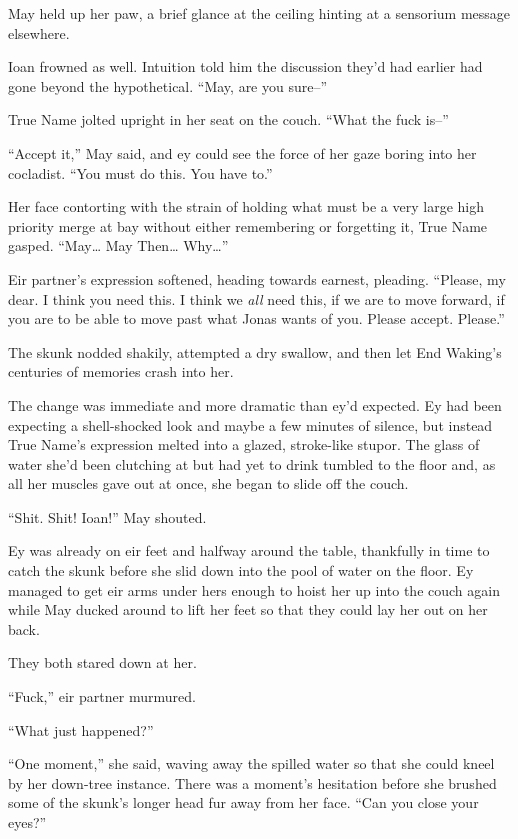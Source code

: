May held up her paw, a brief glance at the ceiling hinting at a sensorium message elsewhere.

Ioan frowned as well. Intuition told him the discussion they'd had earlier had gone beyond the hypothetical. ``May, are you sure--''

True Name jolted upright in her seat on the couch. ``What the fuck is--''

``Accept it,'' May said, and ey could see the force of her gaze boring into her cocladist. ``You must do this. You have to.''

Her face contorting with the strain of holding what must be a very large high priority merge at bay without either remembering or forgetting it, True Name gasped. ``May\ldots{} May Then\ldots{} Why\ldots{}''

Eir partner's expression softened, heading towards earnest, pleading. ``Please, my dear. I think you need this. I think we \emph{all} need this, if we are to move forward, if you are to be able to move past what Jonas wants of you. Please accept. Please.''

The skunk nodded shakily, attempted a dry swallow, and then let End Waking's centuries of memories crash into her.

The change was immediate and more dramatic than ey'd expected. Ey had been expecting a shell-shocked look and maybe a few minutes of silence, but instead True Name's expression melted into a glazed, stroke-like stupor. The glass of water she'd been clutching at but had yet to drink tumbled to the floor and, as all her muscles gave out at once, she began to slide off the couch.

``Shit. Shit! Ioan!'' May shouted.

Ey was already on eir feet and halfway around the table, thankfully in time to catch the skunk before she slid down into the pool of water on the floor. Ey managed to get eir arms under hers enough to hoist her up into the couch again while May ducked around to lift her feet so that they could lay her out on her back.

They both stared down at her.

``Fuck,'' eir partner murmured.

``What just happened?''

``One moment,'' she said, waving away the spilled water so that she could kneel by her down-tree instance. There was a moment's hesitation before she brushed some of the skunk's longer head fur away from her face. ``Can you close your eyes?''

